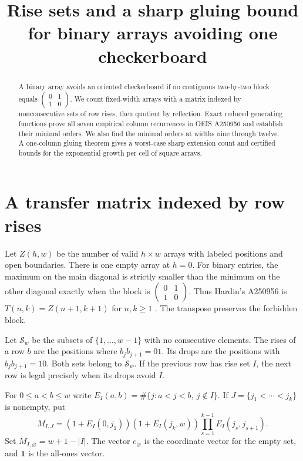 \documentclass[11pt]{article}
\title{Rise sets and a sharp gluing bound for binary arrays avoiding one checkerboard}
\author{}
\date{}
\begin{document}
\maketitle
\begin{abstract}
A binary array avoids an oriented checkerboard if no contiguous two-by-two block equals $\left(\begin{smallmatrix}0&1\\1&0\end{smallmatrix}\right)$. We count fixed-width arrays with a matrix indexed by nonconsecutive sets of row rises, then quotient by reflection. Exact reduced generating functions prove all seven empirical column recurrences in OEIS A250956 and establish their minimal orders. We also find the minimal orders at widths nine through twelve. A one-column gluing theorem gives a worst-case sharp extension count and certified bounds for the exponential growth per cell of square arrays.
\end{abstract}

\section{A transfer matrix indexed by row rises}
Let $Z(h,w)$ be the number of valid $h\times w$ arrays with labeled positions and open boundaries. There is one empty array at $h=0$. For binary entries, the maximum on the main diagonal is strictly smaller than the minimum on the other diagonal exactly when the block is $\left(\begin{smallmatrix}0&1\\1&0\end{smallmatrix}\right)$. Thus Hardin's A250956 is $T(n,k)=Z(n+1,k+1)$ for $n,k\geq1$ \cite{hardin}. The transpose preserves the forbidden block.

Let $\mathcal S_w$ be the subsets of $\{1,\ldots,w-1\}$ with no consecutive elements. The rises of a row $b$ are the positions where $b_jb_{j+1}=01$. Its drops are the positions with $b_jb_{j+1}=10$. Both sets belong to $\mathcal S_w$. If the previous row has rise set $I$, the next row is legal precisely when its drops avoid $I$.

For $0\leq a<b\leq w$ write $E_I(a,b)=\#\{j:a<j<b,\ j\notin I\}$. If $J=\{j_1<\cdots<j_k\}$ is nonempty, put
\begin{equation}
 M_{I,J}=(1+E_I(0,j_1))(1+E_I(j_k,w))
           \prod_{s=1}^{k-1} E_I(j_s,j_{s+1}).
 \label{eq:transfer}
\end{equation}
Set $M_{I,\varnothing}=w+1-|I|$. The vector $e_{\varnothing}$ is the coordinate vector for the empty set, and $\mathbf1$ is the all-ones vector.
\end{document}
